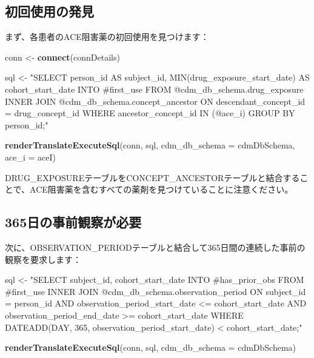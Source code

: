 \documentclass[
  11pt]{book}
\newenvironment{Shaded}{\begin{snugshade}}{\end{snugshade}}
\newcommand{\AttributeTok}[1]{\textcolor[rgb]{0.13,0.29,0.53}{#1}}
\newcommand{\FunctionTok}[1]{\textcolor[rgb]{0.13,0.29,0.53}{\textbf{#1}}}
\newcommand{\NormalTok}[1]{#1}
\newcommand{\OtherTok}[1]{\textcolor[rgb]{0.56,0.35,0.01}{#1}}
\newcommand{\StringTok}[1]{\textcolor[rgb]{0.31,0.60,0.02}{#1}}
\theoremstyle{definition}
\theoremstyle{definition}
\theoremstyle{definition}
\theoremstyle{definition}
\theoremstyle{remark}
\begin{document}
\subsection{初回使用の発見}\label{ux521dux56deux4f7fux7528ux306eux767aux898b}

まず、各患者のACE阻害薬の初回使用を見つけます：

\begin{Shaded}
\begin{Highlighting}[]
\NormalTok{conn }\OtherTok{\textless{}{-}} \FunctionTok{connect}\NormalTok{(connDetails)}

\NormalTok{sql }\OtherTok{\textless{}{-}} \StringTok{"SELECT person\_id AS subject\_id,}
\StringTok{  MIN(drug\_exposure\_start\_date) AS cohort\_start\_date}
\StringTok{INTO \#first\_use}
\StringTok{FROM @cdm\_db\_schema.drug\_exposure}
\StringTok{INNER JOIN @cdm\_db\_schema.concept\_ancestor}
\StringTok{  ON descendant\_concept\_id = drug\_concept\_id}
\StringTok{WHERE ancestor\_concept\_id IN (@ace\_i)}
\StringTok{GROUP BY person\_id;"}

\FunctionTok{renderTranslateExecuteSql}\NormalTok{(conn,}
\NormalTok{                          sql,}
                          \AttributeTok{cdm\_db\_schema =}\NormalTok{ cdmDbSchema,}
                          \AttributeTok{ace\_i =}\NormalTok{ aceI)}
\end{Highlighting}
\end{Shaded}

DRUG\_EXPOSUREテーブルをCONCEPT\_ANCESTORテーブルと結合することで、ACE阻害薬を含むすべての薬剤を見つけていることに注意ください。

\subsection{365日の事前観察が必要}\label{ux65e5ux306eux4e8bux524dux89b3ux5bdfux304cux5fc5ux8981}

次に、OBSERVATION\_PERIODテーブルと結合して365日間の連続した事前の観察を要求します：

\begin{Shaded}
\begin{Highlighting}[]
\NormalTok{sql }\OtherTok{\textless{}{-}} \StringTok{"SELECT subject\_id,}
\StringTok{  cohort\_start\_date}
\StringTok{INTO \#has\_prior\_obs}
\StringTok{FROM \#first\_use}
\StringTok{INNER JOIN @cdm\_db\_schema.observation\_period}
\StringTok{  ON subject\_id = person\_id}
\StringTok{    AND observation\_period\_start\_date \textless{}= cohort\_start\_date}
\StringTok{    AND observation\_period\_end\_date \textgreater{}= cohort\_start\_date}
\StringTok{WHERE DATEADD(DAY, 365, observation\_period\_start\_date) \textless{} cohort\_start\_date;"}

\FunctionTok{renderTranslateExecuteSql}\NormalTok{(conn, sql, }\AttributeTok{cdm\_db\_schema =}\NormalTok{ cdmDbSchema)}
\end{Highlighting}
\end{Shaded}
\end{document}
